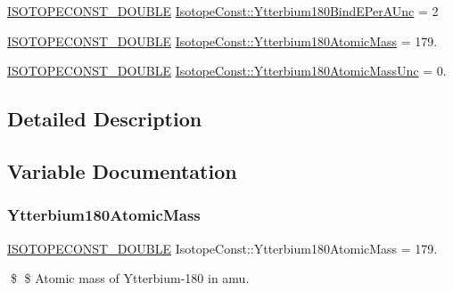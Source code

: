 \begin{DoxyCompactItemize}
\mbox{\hyperlink{group___isotope_const-_macros_ga8f45a7272ce02c0b4c65c44636ed719a}{I\+S\+O\+T\+O\+P\+E\+C\+O\+N\+S\+T\+\_\+\+D\+O\+U\+B\+LE}} \mbox{\hyperlink{group___isotope_const-_ytterbium-_yb180_ga741e7f770abb46b2d825f3becd534d86}{Isotope\+Const\+::\+Ytterbium180\+Bind\+E\+Per\+A\+Unc}} = 2
\item 
\mbox{\hyperlink{group___isotope_const-_macros_ga8f45a7272ce02c0b4c65c44636ed719a}{I\+S\+O\+T\+O\+P\+E\+C\+O\+N\+S\+T\+\_\+\+D\+O\+U\+B\+LE}} \mbox{\hyperlink{group___isotope_const-_ytterbium-_yb180_ga44aa057dc154fe69135330c502249845}{Isotope\+Const\+::\+Ytterbium180\+Atomic\+Mass}} = 179.
\item 
\mbox{\hyperlink{group___isotope_const-_macros_ga8f45a7272ce02c0b4c65c44636ed719a}{I\+S\+O\+T\+O\+P\+E\+C\+O\+N\+S\+T\+\_\+\+D\+O\+U\+B\+LE}} \mbox{\hyperlink{group___isotope_const-_ytterbium-_yb180_ga9ca3b43172494a9367e7ea0c40b900d8}{Isotope\+Const\+::\+Ytterbium180\+Atomic\+Mass\+Unc}} = 0.
\end{DoxyCompactItemize}


\subsection{Detailed Description}


\subsection{Variable Documentation}
\mbox{\label{group___isotope_const-_ytterbium-_yb180_ga44aa057dc154fe69135330c502249845}} 
\subsubsection{\texorpdfstring{Ytterbium180\+Atomic\+Mass}{Ytterbium180AtomicMass}}
{\footnotesize\ttfamily \mbox{\hyperlink{group___isotope_const-_macros_ga8f45a7272ce02c0b4c65c44636ed719a}{I\+S\+O\+T\+O\+P\+E\+C\+O\+N\+S\+T\+\_\+\+D\+O\+U\+B\+LE}} Isotope\+Const\+::\+Ytterbium180\+Atomic\+Mass = 179.}

\$ \$ Atomic mass of Ytterbium-\/180 in amu. \mbox{\label{group___isotope_const-_ytterbium-_yb180_ga9ca3b43172494a9367e7ea0c40b900d8}} 
